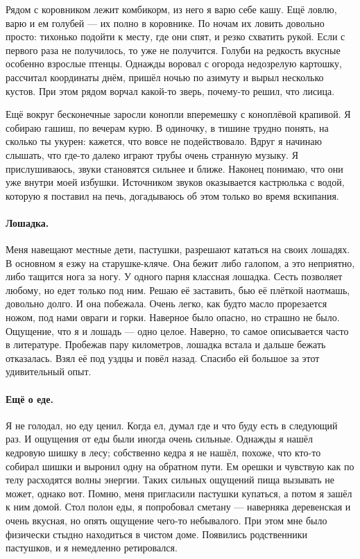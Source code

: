 \documentclass{book}
\begin{document}
Рядом с коровником лежит комбикорм, из него я варю себе кашу.
Ещё ловлю, варю и ем голубей --- их полно в коровнике.
По ночам их ловить довольно просто: тихонько подойти к месту, где они спят, и резко схватить рукой.
Если с первого раза не получилось, то уже не получится.
Голуби на редкость вкусные особенно взрослые птенцы.
Однажды воровал с огорода недозрелую картошку, рассчитал координаты днём, пришёл ночью по азимуту и вырыл несколько кустов.
При этом рядом ворчал какой-то зверь, почему-то решил, что лисица.

Ещё вокруг бесконечные заросли конопли вперемешку с коноплёвой крапивой.
Я собираю гашиш, по вечерам курю.
В одиночку, в тишине трудно понять, на сколько ты укурен: кажется, что вовсе не подействовало.
Вдруг я начинаю слышать, что где-то далеко играют трубы очень странную музыку.
Я прислушиваюсь, звуки становятся сильнее и ближе.
Наконец понимаю, что они уже внутри моей избушки.
Источником звуков оказывается кастрюлька с водой, которую я поставил на печь, догадываюсь об этом только во время вскипания.

\paragraph{Лошадка.}
Меня навещают местные дети, пастушки, разрешают кататься на своих лошадях.
В основном я езжу на старушке-кляче.
Она бежит либо галопом, а это неприятно, либо тащится нога за ногу.
У одного парня классная лошадка.
Сесть позволяет любому, но едет только под ним.
Решаю её заставить, бью её плёткой наотмашь, довольно долго.
И она побежала.
Очень легко, как будто масло прорезается ножом, под нами овраги и горки.
Наверное было опасно, но страшно не было.
Ощущение, что я и лошадь --- одно целое.
Наверно, то самое описывается часто в литературе.
Пробежав пару километров, лошадка встала и дальше бежать отказалась.
Взял её под уздцы и повёл назад.
Спасибо ей большое за этот удивительный опыт.

\paragraph{Ещё о еде.}
Я не голодал, но еду ценил.
Когда ел, думал где и что буду есть в следующий раз.
И ощущения от еды были иногда очень сильные.
Однажды я нашёл кедровую шишку в лесу; собственно кедра я не нашёл, похоже, что кто-то собирал шишки и выронил одну на обратном пути.
Ем орешки и чувствую как по телу расходятся волны энергии.
Таких сильных ощущений пища вызывать не может, однако вот.
Помню, меня пригласили пастушки купаться, а потом я зашёл к ним домой.
Стол полон еды, я попробовал сметану --- наверняка деревенская и очень вкусная, но опять ощущение чего-то небывалого.
При этом мне было физически стыдно находиться в чистом доме.
Появились родственники пастушков, и я немедленно ретировался.
\end{document}
